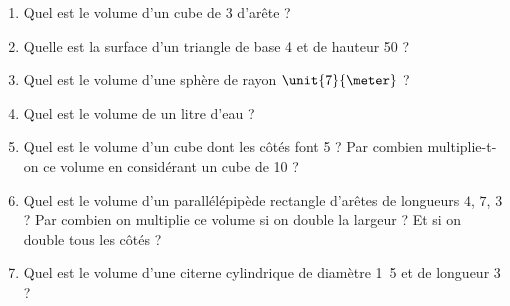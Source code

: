 
\begin{exercice}\label{exoSeconde-0090}

    \begin{multicols}{2}
        \begin{enumerate}
            \item
                Quel est le volume d'un cube de \unit{3}{\centi\meter} d'arête ? 
            \item
                Quelle est la surface d'un triangle de base \unit{4}{\meter} et de hauteur \unit{50}{\centi\meter} ?
            \item
                Quel est le volume d'une sphère de rayon \( \unit{7}{\meter}\) ?
            \item
                Quel est le volume de un litre d'eau ?
            \item
                Quel est le volume d'un cube dont les côtés font \unit{5}{\meter} ? Par combien multiplie-t-on ce volume en considérant un cube de \unit{10}{\meter} ?
            \item
                Quel est le volume d'un parallélépipède rectangle d'arêtes de longueurs \( 4\), \( 7\), \( 3\) ? Par combien on multiplie ce volume si on double la largeur ? Et si on double tous les côtés ?
            \item
                Quel est le volume d'une citerne cylindrique de diamètre \unit{1.5}{\meter} et de longueur \unit{3}{\meter} ?
        \end{enumerate}
    \end{multicols}

\end{exercice}
